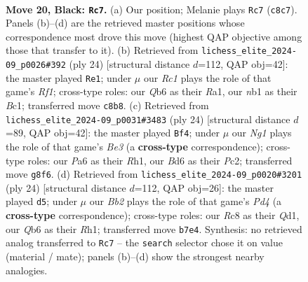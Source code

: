 \documentclass[11pt]{article}
\begin{document}
\clearpage

\begin{figure}[p]\centering
\begin{subfigure}{0.46\textwidth}\centering
\resizebox{\linewidth}{!}{%
\newchessgame
\chessboard[
  setfen={2rk2nr/1b3Qp1/pq1b4/2p3Pp/5P1P/2P4R/PP6/RNB1K2B b Q - 0 20},
  showmover=false,
  pgfstyle=straightmove, color=movearrow, markmove={c8-c7}
]}
\caption{}
\end{subfigure}\hfill
\begin{subfigure}{0.46\textwidth}\centering
\resizebox{\linewidth}{!}{%
\newchessgame
\chessboard[
  setfen={rnb1k2r/p3bppp/2p2p2/8/PpBq4/8/1P1N1PPP/R1BQ1RK1 w kq - 1 13},
  showmover=false,
  pgfstyle=straightmove, color=movearrow, markmove={f1-e1}
]}
\caption{}
\end{subfigure}
\\[4pt]
\begin{subfigure}{0.46\textwidth}\centering
\resizebox{\linewidth}{!}{%
\newchessgame
\chessboard[
  setfen={rn2kb1r/pp3ppp/4p3/3pq1P1/8/4BQ1P/PPP5/2KR1B1R w kq - 0 13},
  showmover=false,
  pgfstyle=straightmove, color=movearrow, markmove={e3-f4}
]}
\caption{}
\end{subfigure}\hfill
\begin{subfigure}{0.46\textwidth}\centering
\resizebox{\linewidth}{!}{%
\newchessgame
\chessboard[
  setfen={r1b1k2r/pp3pbp/2n3p1/4p3/2BPP3/q1B5/P3NPPP/R2QK2R w KQkq - 0 13},
  showmover=false,
  pgfstyle=straightmove, color=movearrow, markmove={d4-d5}
]}
\caption{}
\end{subfigure}
\caption{\textbf{Move 20, Black: \texttt{Rc7}.} (a) Our position; Melanie plays \texttt{Rc7} (\texttt{c8c7}). Panels (b)--(d) are the retrieved master positions whose correspondence most drove this move (highest QAP objective among those that transfer to it). (b) Retrieved from \texttt{lichess\_elite\_2024-09\_p0026\#392} (ply 24) [structural distance $d$=112, QAP obj=42]: the master played \texttt{Re1}; under $\mu$ our \emph{Rc1} plays the role of that game's \emph{Rf1}; cross-type roles: our \emph{Q}b6 as their \emph{R}a1, our \emph{n}b1 as their \emph{B}c1; transferred move \texttt{c8b8}. (c) Retrieved from \texttt{lichess\_elite\_2024-09\_p0031\#3483} (ply 24) [structural distance $d$=89, QAP obj=42]: the master played \texttt{Bf4}; under $\mu$ our \emph{Ng1} plays the role of that game's \emph{Be3} (a \textbf{cross-type} correspondence); cross-type roles: our \emph{P}a6 as their \emph{R}h1, our \emph{B}d6 as their \emph{P}c2; transferred move \texttt{g8f6}. (d) Retrieved from \texttt{lichess\_elite\_2024-09\_p0020\#3201} (ply 24) [structural distance $d$=112, QAP obj=26]: the master played \texttt{d5}; under $\mu$ our \emph{Bb2} plays the role of that game's \emph{Pd4} (a \textbf{cross-type} correspondence); cross-type roles: our \emph{R}c8 as their \emph{Q}d1, our \emph{Q}b6 as their \emph{R}h1; transferred move \texttt{b7e4}. Synthesis: no retrieved analog transferred to \texttt{Rc7} -- the \texttt{search} selector chose it on value (material / mate); panels (b)--(d) show the strongest nearby analogies.}
\label{fig:thought-m39}
\end{figure}
\end{document}
